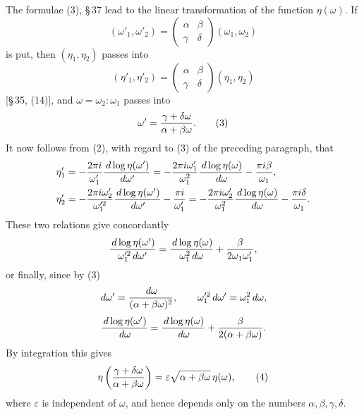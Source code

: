 \documentclass[11pt]{article}
\providecommand{\dd}{\,d}
\begin{document}
The formulae (3), \S\,37 lead to the linear transformation of the function $\eta(\omega)$. If
\begin{equation}
(\omega'_1,\omega'_2)=
\begin{pmatrix}\alpha&\beta\\ \gamma&\delta\end{pmatrix}(\omega_1,\omega_2) 
\tag{1}
\end{equation}
is put, then $(\eta_1,\eta_2)$ passes into
\begin{equation}
(\eta'_1,\eta'_2)=
\begin{pmatrix}\alpha&\beta\\ \gamma&\delta\end{pmatrix}(\eta_1,\eta_2) 
\tag{2}
\end{equation}
[\S\,35, (14)], and $\omega=\omega_2:\omega_1$ passes into
\begin{equation}
\omega'={\gamma+\delta\omega\over \alpha+\beta\omega}. 
\tag{3}
\end{equation}
It now follows from (2), with regard to (3) of the preceding paragraph, that
\begin{align*}
\eta'_1&=-{2\pi i\over \omega'_1}{\dd\log\eta(\omega')\over\dd\omega'}
=-{2\pi i\omega'_1\over\omega_1^2}{\dd\log\eta(\omega)\over\dd\omega}-{\pi i\beta\over\omega_1},\\
\eta'_2&=-{2\pi i\omega'_2\over \omega_1'^2}{\dd\log\eta(\omega')\over\dd\omega'}-{\pi i\over\omega'_1}
=-{2\pi i\omega'_2\over\omega_1^2}{\dd\log\eta(\omega)\over\dd\omega}-{\pi i\delta\over\omega_1}.
\end{align*}
These two relations give concordantly
\[
 {\dd\log\eta(\omega')\over \omega_1'^2\dd\omega'}
 = {\dd\log\eta(\omega)\over\omega_1^2\dd\omega}
 +{\beta\over2\omega_1\omega_1'},
\]
or finally, since by (3)
\[
\dd\omega'={\dd\omega\over(\alpha+\beta\omega)^2},
\qquad \omega_1'^2\dd\omega'=\omega_1^2\dd\omega,
\]
\[
{\dd\log\eta(\omega')\over\dd\omega}
={\dd\log\eta(\omega)\over\dd\omega}+{\beta\over2(\alpha+\beta\omega)}.
\]
By integration this gives
\begin{equation}
\eta\left({\gamma+\delta\omega\over\alpha+\beta\omega}\right)
=\varepsilon\sqrt{\alpha+\beta\omega}\,\eta(\omega),
\tag{4}
\end{equation}
where $\varepsilon$ is independent of $\omega$, and hence depends only on the numbers $\alpha,\beta,\gamma,\delta$.
\end{document}
